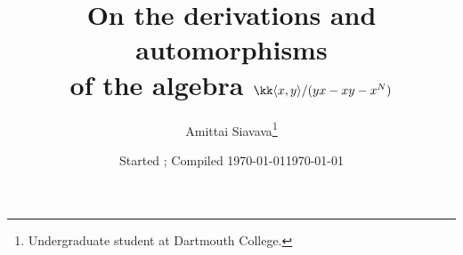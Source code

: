 

\title{%
  On the derivations and automorphisms\\
  of the algebra $\kk\langle x,y\rangle/(yx-xy-x^N)$
}
\author{Amittai Siavava\thanks{%
    Undergraduate student at Dartmouth College.
  }
}
\ifoptionfinal
  {\date{Started ; Compiled \today}}
  {\date{\today}}


\maketitle

\tableofcontents
